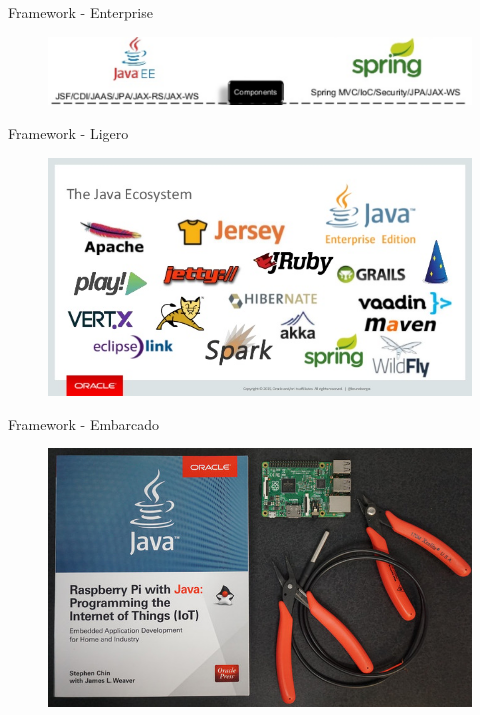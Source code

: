 \documentclass{beamer}
\begin{document}
\begin{frame}{Framework - Enterprise}
	\begin{figure}
		\centering
		\includegraphics[width=\linewidth]{Images/javaeesp}
	\end{figure}
\end{frame}

\begin{frame}{Framework - Ligero}
	\begin{figure}
		\centering
		\includegraphics[width=0.9\linewidth]{Images/ecosystem}
	\end{figure}
\end{frame}

\begin{frame}{Framework - Embarcado}
	\begin{figure}
		\centering
		\includegraphics[width=0.9\linewidth]{Images/javapy}
	\end{figure}
\end{frame}
\end{document}
